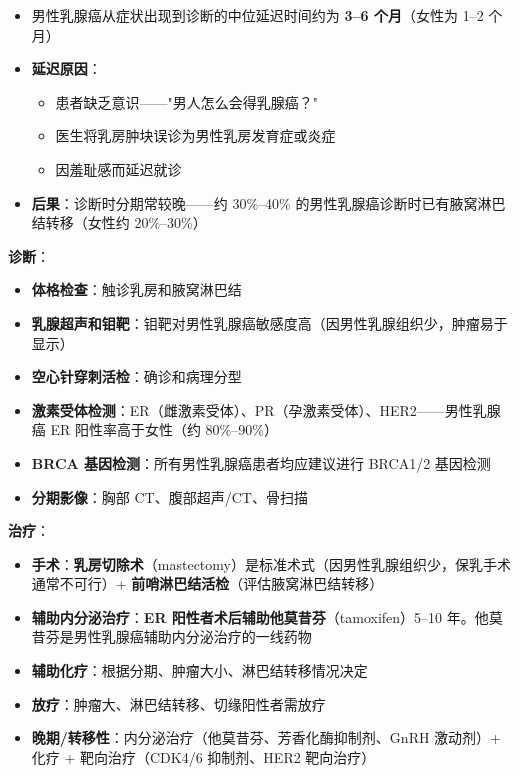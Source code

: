 \documentclass[12pt,a4paper,twoside]{ctexbook}
\begin{document}
\begin{itemize}[leftmargin=2cm]
	\item 男性乳腺癌从症状出现到诊断的中位延迟时间约为 \textbf{3--6 个月}（女性为 1--2 个月）
	\item \textbf{延迟原因}：
	\begin{itemize}
		\item 患者缺乏意识——"男人怎么会得乳腺癌？"
		\item 医生将乳房肿块误诊为男性乳房发育症或炎症
		\item 因羞耻感而延迟就诊
	\end{itemize}
	\item \textbf{后果}：诊断时分期常较晚——约 30\%--40\% 的男性乳腺癌诊断时已有腋窝淋巴结转移（女性约 20\%--30\%）
\end{itemize}

\vspace{0.5em}
\noindent\textbf{诊断}：

\begin{itemize}[leftmargin=2cm]
	\item \textbf{体格检查}：触诊乳房和腋窝淋巴结
	\item \textbf{乳腺超声和钼靶}：钼靶对男性乳腺癌敏感度高（因男性乳腺组织少，肿瘤易于显示）
	\item \textbf{空心针穿刺活检}：确诊和病理分型
	\item \textbf{激素受体检测}：ER（雌激素受体）、PR（孕激素受体）、HER2——男性乳腺癌 ER 阳性率高于女性（约 80\%--90\%）
	\item \textbf{BRCA 基因检测}：所有男性乳腺癌患者均应建议进行 BRCA1/2 基因检测
	\item \textbf{分期影像}：胸部 CT、腹部超声/CT、骨扫描
\end{itemize}

\vspace{0.5em}
\noindent\textbf{治疗}：

\begin{itemize}[leftmargin=2cm]
	\item \textbf{手术}：\textbf{乳房切除术}（mastectomy）是标准术式（因男性乳腺组织少，保乳手术通常不可行）+ \textbf{前哨淋巴结活检}（评估腋窝淋巴结转移）
	\item \textbf{辅助内分泌治疗}：\textbf{ER 阳性者术后辅助他莫昔芬}（tamoxifen）5--10 年。他莫昔芬是男性乳腺癌辅助内分泌治疗的一线药物
	\item \textbf{辅助化疗}：根据分期、肿瘤大小、淋巴结转移情况决定
	\item \textbf{放疗}：肿瘤大、淋巴结转移、切缘阳性者需放疗
	\item \textbf{晚期/转移性}：内分泌治疗（他莫昔芬、芳香化酶抑制剂、GnRH 激动剂）+ 化疗 + 靶向治疗（CDK4/6 抑制剂、HER2 靶向治疗）
\end{itemize}
\end{document}
